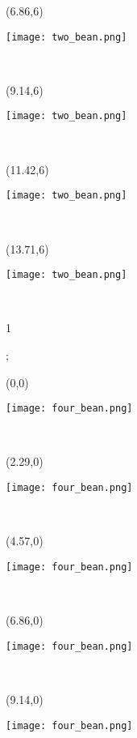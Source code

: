 \documentclass[a4paper]{article}
\newcommand{\myXfourBean}[0]{
\texttt{[image: four\_bean.png]}
}
\newcommand{\myXtwoBean}[0]{
\texttt{[image: two\_bean.png]}
}
\newcommand{\mycard}[5]{%
	\tiny #1 #2
	\hspace{-0.75cm} \large#3\\
}
\begin{document}
\begin{textblock}{2.29}(6.86,6)
\mycard{}{}{
\myXtwoBean
}{}{} 
\end{textblock}

\begin{textblock}{2.29}(9.14,6)
\mycard{}{}{
\myXtwoBean
}{}{} 
\end{textblock}

\begin{textblock}{2.29}(11.42,6)
\mycard{}{}{
\myXtwoBean
}{}{} 
\end{textblock}

\begin{textblock}{2.29}(13.71,6)
\mycard{}{}{
\myXtwoBean
}{}{} 
\end{textblock}









\begin{tiny}1\end{tiny}\newpage;


\begin{textblock}{2.29}(0,0)
\mycard{}{}{
\myXfourBean
}{}{} 
\end{textblock}

\begin{textblock}{2.29}(2.29,0)
\mycard{}{}{
\myXfourBean
}{}{} 
\end{textblock}

\begin{textblock}{2.29}(4.57,0)
\mycard{}{}{
\myXfourBean
}{}{} 
\end{textblock}

\begin{textblock}{2.29}(6.86,0)
\mycard{}{}{
\myXfourBean
}{}{} 
\end{textblock}

\begin{textblock}{2.29}(9.14,0)
\mycard{}{}{
\myXfourBean
}{}{} 
\end{textblock}
\end{document}
